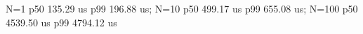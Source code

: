 N=1 p50 135.29 us p99 196.88 us; N=10 p50 499.17 us p99 655.08 us; N=100 p50 4539.50 us p99 4794.12 us
